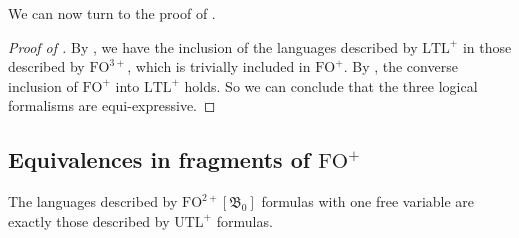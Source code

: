 \documentclass[a4paper,UKenglish,cleveref, autoref, thm-restate]{lipics-v2021}
\newcommand{\FO}{\mathrm{FO}}
\newcommand{\FOp}{\FO^+}
\newcommand{\FOthp}{\FO^{3+}}
\newcommand{\FOtwp}{\FO^{2+}}
\newcommand{\LTL}{\mathrm{LTL}}
\newcommand{\LTLp}{\LTL^+}
\newcommand{\UTL}{\mathrm{UTL}}
\newcommand{\UTLp}{\UTL^+}
\newcommand{\bin}{\mathfrak{B}}
\begin{document}
We can now turn to the proof of .


\begin{proof}[Proof of ]
    By , we have the inclusion of the languages described by $\LTLp$ in those described by $\FOthp$, which is trivially included in $\FOp$. By , the converse inclusion of $\FOp$ into $\LTLp$ holds. So we can conclude that the three logical formalisms are equi-expressive.
\end{proof}




\subsection{\texorpdfstring{Equivalences in fragments of $\FOp$}{Equivalences in fragments of FO+}} \label{sec:equivfrag}



\begin{theorem}\label{equiv2}
    The languages described by $\FOtwp[\bin_0]$ formulas with one free variable are exactly those described by $\UTLp$ formulas.
\end{theorem}
\end{document}

